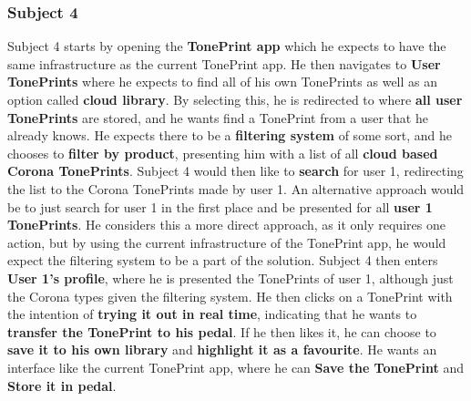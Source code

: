 \subsubsection{Subject 4}
\label{Subject4}
Subject 4 starts by opening the \textbf{TonePrint app} which he expects to have the same infrastructure as the current TonePrint app. He then navigates to \textbf{User TonePrints} where he expects to find all of his own TonePrints as well as an option called \textbf{cloud library}. By selecting this, he is redirected to where \textbf{all user TonePrints} are stored, and he wants find a TonePrint from a user that he already knows. He expects there to be a \textbf{filtering system} of some sort, and he chooses to \textbf{filter by product}, presenting him with a list of all \textbf{cloud based Corona TonePrints}. Subject 4 would then like to \textbf{search} for user 1, redirecting the list to the Corona TonePrints made by user 1. An alternative approach would be to just search for user 1 in the first place and be presented for all \textbf{user 1 TonePrints}. He considers this a more direct approach, as it only requires one action, but by using the current infrastructure of the TonePrint app, he would expect the filtering system to be a part of the solution. Subject 4 then enters \textbf{User 1’s profile}, where he is presented the TonePrints of user 1, although just the Corona types given the filtering system. He then clicks on a TonePrint with the intention of \textbf{trying it out in real time}, indicating that he wants to \textbf{transfer the TonePrint to his pedal}. If he then likes it, he can choose to \textbf{save it to his own library} and \textbf{highlight it as a favourite}. He wants an interface like the current TonePrint app, where he can \textbf{Save the TonePrint} and \textbf{Store it in pedal}. \\
%
